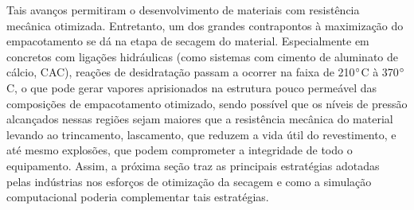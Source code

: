 Tais avanços permitiram o desenvolvimento de materiais com resistência mecânica
otimizada. Entretanto, um dos grandes contrapontos à maximização do
empacotamento se dá na etapa de secagem do material. Especialmente em concretos
com ligações hidráulicas (como sistemas com cimento de aluminato de cálcio,
CAC), reações de desidratação passam a ocorrer na faixa de 210$\degree$C à
370$\degree$C, o que pode gerar vapores aprisionados na estrutura pouco
permeável das composições de empacotamento otimizado, sendo possível que os
níveis de pressão alcançados nessas regiões sejam maiores que a resistência
mecânica do material levando ao trincamento, lascamento, que reduzem a vida útil
do revestimento, e até mesmo explosões, que podem comprometer a integridade de
todo o equipamento. Assim, a próxima seção traz as principais estratégias
adotadas pelas indústrias nos esforços de otimização da secagem e como a
simulação computacional poderia complementar tais estratégias.
 

